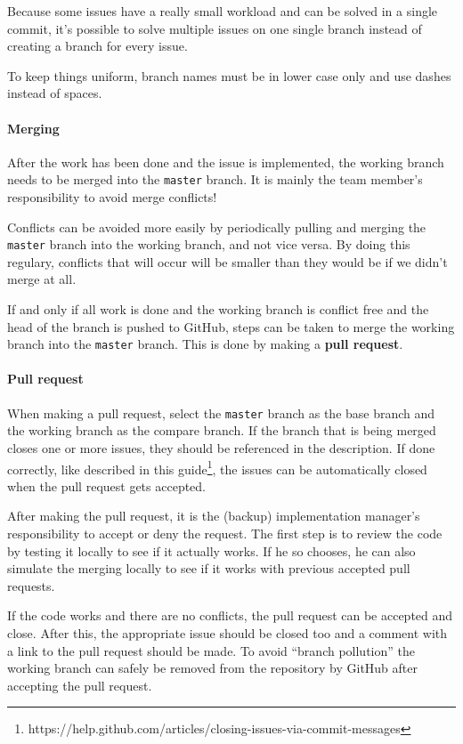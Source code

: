 \documentclass[12pt]{article}
\begin{document}
Because some issues have a really small workload and can be solved in a
single commit, it's possible to solve multiple issues on one single
branch instead of creating a branch for every issue.

To keep things uniform, branch names must be in lower case only and use
dashes instead of spaces.

\paragraph{Merging}\label{merging}

After the work has been done and the issue is implemented, the working
branch needs to be merged into the \texttt{master} branch. It is mainly
the team member's responsibility to avoid merge conflicts!

Conflicts can be avoided more easily by periodically pulling and merging
the \texttt{master} branch into the working branch, and not vice versa.
By doing this regulary, conflicts that will occur will be smaller than
they would be if we didn't merge at all.

If and only if all work is done and the working branch is conflict free
and the head of the branch is pushed to GitHub, steps can be taken to
merge the working branch into the \texttt{master} branch. This is done
by making a \textbf{pull request}.

\paragraph{Pull request}\label{pull-request}

When making a pull request, select the \texttt{master} branch as the
base branch and the working branch as the compare branch. If the branch
that is being merged closes one or more issues, they should be
referenced in the description. If done correctly, like described in
this
guide\footnote{https://help.github.com/articles/closing-issues-via-commit-messages}, the issues can be automatically closed when the pull request
gets accepted.

After making the pull request, it is the (backup) implementation
manager's responsibility to accept or deny the request. The first step
is to review the code by testing it locally to see if it actually works.
If he so chooses, he can also simulate the merging locally to see if it
works with previous accepted pull requests.

If the code works and there are no conflicts, the pull request can be
accepted and close. After this, the appropriate issue should be closed
too and a comment with a link to the pull request should be made. To
avoid ``branch pollution'' the working branch can safely be removed from
the repository by GitHub after accepting the pull request.
\end{document}
